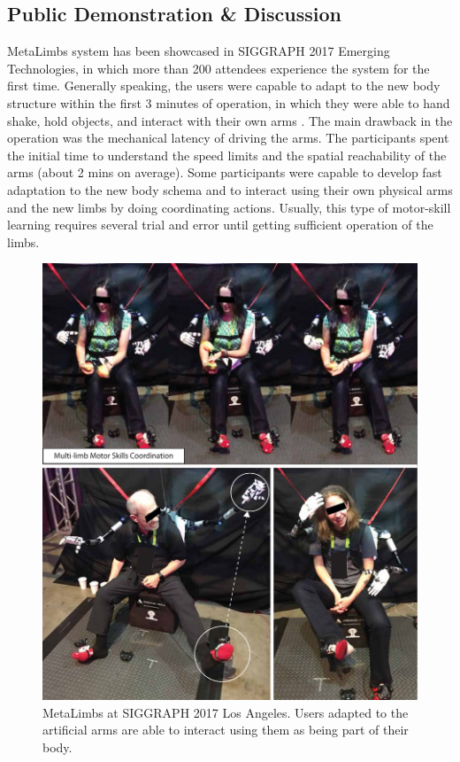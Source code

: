 \subsection{Public Demonstration \& Discussion}

MetaLimbs system has been showcased in SIGGRAPH 2017 Emerging Technologies, in which more than 200 attendees experience the system for the first time. Generally speaking, the users were capable to adapt to the new body structure within the first 3 minutes of operation, in which they were able to hand shake, hold objects, and interact with their own arms . The main drawback in the operation was the mechanical latency of driving the arms. The participants spent the initial time to understand the speed limits and the spatial reachability of the arms (about 2 mins on average). Some participants were capable to develop fast adaptation to the new body schema and to interact using their own physical arms and the new limbs by doing coordinating actions. Usually, this type of motor-skill learning requires several trial and error until getting sufficient operation of the limbs.

\begin{figure}[t!]
  \centering
  \captionsetup{justification=centering}
  \includegraphics[width=0.85\linewidth]{figures/eval/SIGGRAPH/ML_SIGGRAPH.pdf}
  \par
  \caption{MetaLimbs at SIGGRAPH 2017 Los Angeles. Users adapted to the artificial arms are able to interact using them as being part of their body.}
  \vspace*{\floatsep}
  \label{fig:ET-siggraph}
\end{figure}

